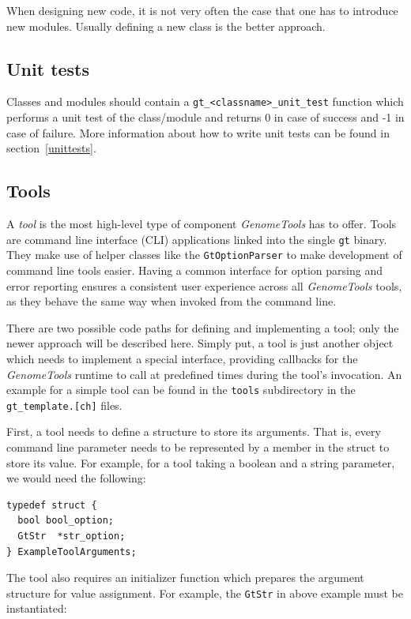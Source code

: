 \documentclass[11pt,final]{article}
\newcommand{\keyword}[1]{\lstinline{#1}}
\newcommand{\Gt}[0]{\emph{GenomeTools}\xspace}
\begin{document}
When designing new code, it is not very often the case that one has to introduce
new modules. Usually defining a new class is the better approach.

\subsection{Unit tests}

Classes and modules should contain a \keyword{gt_<classname>_unit_test} function
which performs a unit test of the class/module and returns 0 in case of success
and -1 in case of failure. More information about how to write unit tests can
be found in section~\ref{unittests}.

\subsection{Tools}

A \emph{tool} is the most high-level type of component \Gt has to offer. Tools
are command line interface (CLI) applications linked into the single \keyword{gt}
binary. They make use of helper classes like the \keyword{GtOptionParser} to
make development of command line tools easier. Having a common interface for
option parsing and error reporting ensures a consistent user experience across
all \Gt tools, as they behave the same way when invoked from the command line.

There are two possible code paths for defining and implementing a tool; only
the newer approach will be described here.
Simply put, a tool is just another object which needs to implement a special
interface, providing callbacks for the \Gt runtime to call at predefined times
during the tool's invocation. An example for a simple tool can
be found in the \keyword{tools} subdirectory in the \keyword{gt_template.[ch]}
files.

First, a tool needs to define a structure to store its arguments. That is,
every command line parameter needs to be represented by a member in the struct
to store its value. For example, for a tool taking a boolean and a string
parameter, we would need the following:

\begin{lstlisting}
typedef struct {
  bool bool_option;
  GtStr  *str_option;
} ExampleToolArguments;
\end{lstlisting}

The tool also requires an initializer function which prepares the argument
structure for value assignment. For example, the \keyword{GtStr} in above
example must be instantiated:
\end{document}
